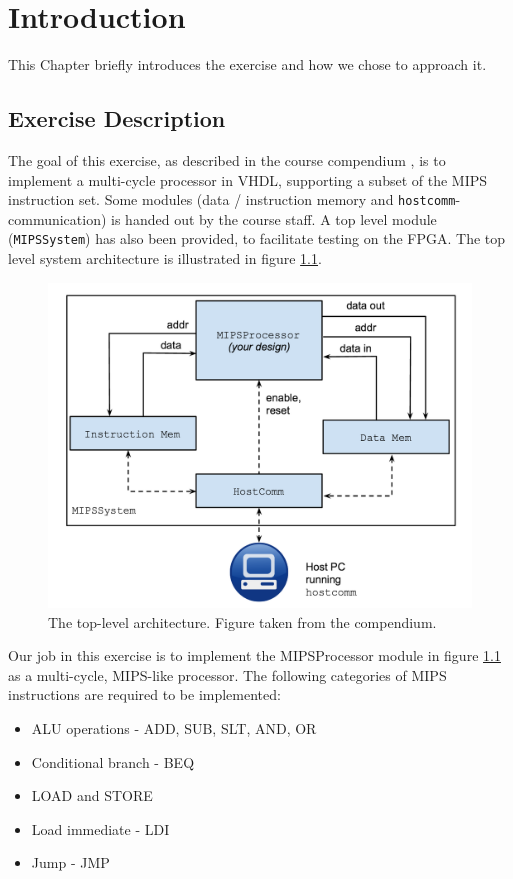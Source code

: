 \chapter{Introduction}
This Chapter briefly introduces the exercise and how we chose to approach it.

\section{Exercise Description}

The goal of this exercise, as described in the course compendium \cite{compendium}, is to implement a multi-cycle processor in VHDL, supporting a subset of the MIPS instruction set.
Some modules (data / instruction memory and \texttt{hostcomm}-communication) is handed out by the course staff.
A top level module (\texttt{MIPSSystem}) has also been provided, to facilitate testing on the FPGA.
The top level system architecture is illustrated in figure \ref{fig:sysarch}.


\begin{figure}[h!]
    \includegraphics[width=\linewidth]{img/sysarch.png}
    \caption{The top-level architecture. Figure taken from the compendium. \cite[p. 48]{compendium}}
    \label{fig:sysarch}
\end{figure}

\newpage
Our job in this exercise is to implement the MIPSProcessor module in figure \ref{fig:sysarch} as a multi-cycle, MIPS-like processor.
The following categories of MIPS instructions are required to be implemented:

\begin{itemize}
    \item ALU operations - ADD, SUB, SLT, AND, OR
    \item Conditional branch - BEQ
    \item LOAD and STORE
    \item Load immediate - LDI
    \item Jump - JMP
\end{itemize}

